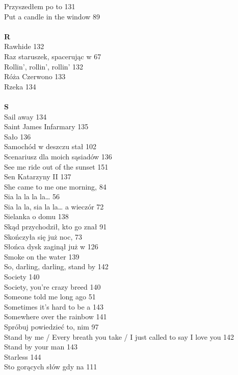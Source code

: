 \documentclass[a5paper, 10pt]{book}
\begin{document}
{\begin{multicols}{3}
    Przyszedłem po to 131\\
    Put a candle in the window 89\\
    \\
    {\footnotesize \textbf{R\\} }
    Rawhide 132\\
    Raz staruszek, spacerując w 67\\
    Rollin', rollin', rollin' 132\\
    Róża Czerwono 133\\
    Rzeka 134\\
    \\
    {\footnotesize \textbf{S\\} }
    Sail away 134\\
    Saint James Infarmary 135\\
    Sało 136\\
    Samochód w deszczu stał 102\\
    Scenariusz dla moich sąsiadów 136\\
    See me ride out of the sunset 151\\
    Sen Katarzyny II 137\\
    She came to me one morning, 84\\
    Sia la la la la… 56\\
    Sia la la, sia la la… a wieczór 72\\
    Sielanka o domu 138\\
    Skąd przychodził, kto go znał 91\\
    Skończyła się już noc, 73\\
    Słońca dysk zaginął już w 126\\
    Smoke on the water 139\\
    So, darling, darling, stand by 142\\
    Society 140\\
    Society, you're crazy breed 140\\
    Someone told me long ago 51\\
    Sometimes it's hard to be a 143\\
    Somewhere over the rainbow 141\\
    Spróbuj powiedzieć to, nim 97\\
    Stand by me / Every breath you take / I just called to say I love you 142\\
    Stand by your man 143\\
    Starless 144\\
    Sto gorących słów gdy na 111\\

\end{multicols}}
\end{document}
